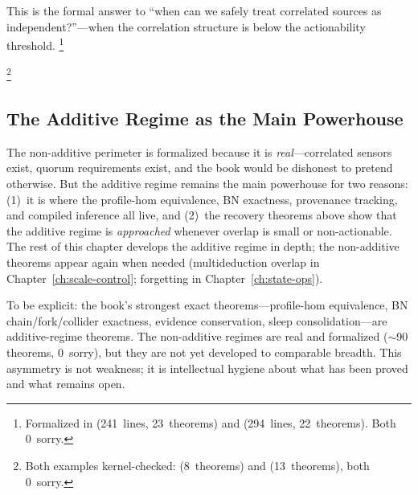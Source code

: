 \documentclass[11pt,openany]{report}
\begin{document}
\noindent
This is the formal answer to ``when can we safely treat
correlated sources as independent?''---when the correlation
structure is below the actionability threshold.%
\footnote{Formalized in
(241~lines, 23~theorems) and
(294~lines, 22~theorems).  Both 0~sorry.}

%
\footnote{Both examples kernel-checked:
(8~theorems) and
(13~theorems), both 0~sorry.}

\subsection{The Additive Regime as the Main Powerhouse}

The non-additive perimeter is formalized because it is
\emph{real}---correlated sensors exist, quorum requirements
exist, and the book would be dishonest to pretend otherwise.
But the additive regime remains the main powerhouse for two
reasons: (1)~it is where the profile-hom equivalence, BN
exactness, provenance tracking, and compiled inference all live,
and (2)~the recovery theorems above show that the additive
regime is \emph{approached} whenever overlap is small or
non-actionable.  The rest of this chapter develops the additive
regime in depth; the non-additive theorems appear again when
needed (multideduction overlap in
Chapter~\ref{ch:scale-control}; forgetting in
Chapter~\ref{ch:state-ops}).

To be explicit: the book's strongest exact theorems---profile-hom
equivalence, BN chain/fork/collider exactness, evidence
conservation, sleep consolidation---are additive-regime theorems.
The non-additive regimes are real and formalized ($\sim$90
theorems, 0~sorry), but they are not yet developed to comparable
breadth.  This asymmetry is not weakness; it is intellectual
hygiene about what has been proved and what remains open.
\end{document}
